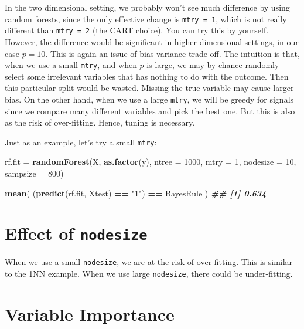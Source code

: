 \documentclass[
]{book}
\newenvironment{Shaded}{\begin{snugshade}}{\end{snugshade}}
\newcommand{\AttributeTok}[1]{\textcolor[rgb]{0.13,0.29,0.53}{#1}}
\newcommand{\DecValTok}[1]{\textcolor[rgb]{0.00,0.00,0.81}{#1}}
\newcommand{\DocumentationTok}[1]{\textcolor[rgb]{0.56,0.35,0.01}{\textbf{\textit{#1}}}}
\newcommand{\FunctionTok}[1]{\textcolor[rgb]{0.13,0.29,0.53}{\textbf{#1}}}
\newcommand{\NormalTok}[1]{#1}
\newcommand{\OtherTok}[1]{\textcolor[rgb]{0.56,0.35,0.01}{#1}}
\newcommand{\SpecialCharTok}[1]{\textcolor[rgb]{0.81,0.36,0.00}{\textbf{#1}}}
\newcommand{\StringTok}[1]{\textcolor[rgb]{0.31,0.60,0.02}{#1}}
\theoremstyle{definition}
\theoremstyle{definition}
\theoremstyle{definition}
\theoremstyle{definition}
\theoremstyle{remark}
\begin{document}
In the two dimensional setting, we probably won't see much difference by using random forests, since the only effective change is \texttt{mtry\ =\ 1}, which is not really different than \texttt{mtry\ =\ 2} (the CART choice). You can try this by yourself.
However, the difference would be significant in higher dimensional settings, in our case \(p=10\). This is again an issue of bias-variance trade-off. The intuition is that, when we use a small \texttt{mtry}, and when \(p\) is large, we may by chance randomly select some irrelevant variables that has nothing to do with the outcome. Then this particular split would be wasted. Missing the true variable may cause larger bias. On the other hand, when we use a large \texttt{mtry}, we will be greedy for signals since we compare many different variables and pick the best one. But this is also as the risk of over-fitting. Hence, tuning is necessary.

Just as an example, let's try a small \texttt{mtry}:

\begin{Shaded}
\begin{Highlighting}[]
\NormalTok{  rf.fit }\OtherTok{=} \FunctionTok{randomForest}\NormalTok{(X, }\FunctionTok{as.factor}\NormalTok{(y), }\AttributeTok{ntree =} \DecValTok{1000}\NormalTok{, }
                        \AttributeTok{mtry =} \DecValTok{1}\NormalTok{, }\AttributeTok{nodesize =} \DecValTok{10}\NormalTok{, }\AttributeTok{sampsize =} \DecValTok{800}\NormalTok{)}

  \FunctionTok{mean}\NormalTok{( (}\FunctionTok{predict}\NormalTok{(rf.fit, Xtest) }\SpecialCharTok{==} \StringTok{"1"}\NormalTok{) }\SpecialCharTok{==}\NormalTok{ BayesRule )}
\DocumentationTok{\#\# [1] 0.634}
\end{Highlighting}
\end{Shaded}

\hypertarget{effect-of-nodesize}{%
\section{\texorpdfstring{Effect of \texttt{nodesize}}{Effect of nodesize}}\label{effect-of-nodesize}}

When we use a small \texttt{nodesize}, we are at the risk of over-fitting. This is similar to the 1NN example. When we use large \texttt{nodesize}, there could be under-fitting.

\hypertarget{variable-importance}{%
\section{Variable Importance}\label{variable-importance}}
\end{document}
